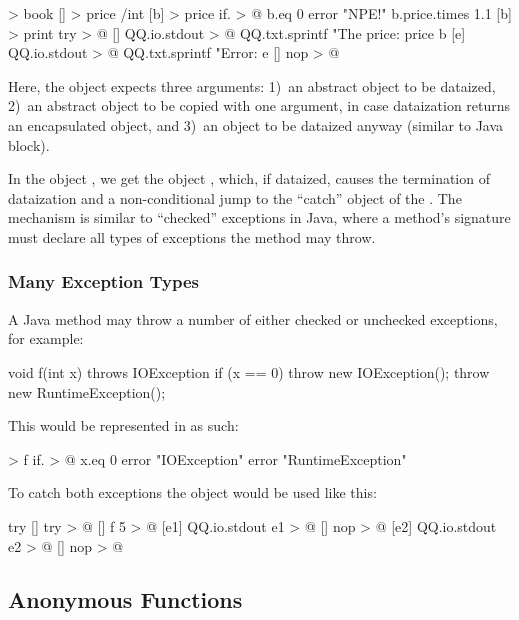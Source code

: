 \documentclass[sigplan,nonacm]{acmart}
\begin{document}
\begin{ffcode}
[] > book
  [] > price /int
[b] > price
  if. > @
    b.eq 0
    error "NPE!"
    b.price.times 1.1
[b] > print
  try > @
    []
      QQ.io.stdout > @
        QQ.txt.sprintf
        "The price: %
        price b
    [e]
      QQ.io.stdout > @
        QQ.txt.sprintf
        "Error: %
        e
    []
      nop > @
\end{ffcode}

Here, the object  expects three arguments: 1)~an abstract object to be dataized, 2)~an abstract object to be copied with one argument, in case dataization returns an encapsulated object, and 3)~an object to be dataized anyway (similar to Java  block).

In the object , we get the object , which, if dataized, causes the termination of dataization and a non-conditional jump to the ``catch'' object of the . The mechanism is similar to ``checked'' exceptions in Java, where a method's signature must declare all types of exceptions the method may throw.

\subsubsection{Many Exception Types}

A Java method may throw a number of either checked or unchecked exceptions, for example:

\begin{ffcode}
void f(int x) throws IOException {
  if (x == 0) {
    throw new IOException();
  }
  throw new RuntimeException();
}
\end{ffcode}

This would be represented in \eolang{} as such:

\begin{ffcode}
[x] > f
  if. > @
    x.eq 0
    error "IOException"
    error "RuntimeException"
\end{ffcode}

To catch both exceptions the object  would be used like this:

\begin{ffcode}
try
  []
    try > @
      []
        f 5 > @
      [e1]
        QQ.io.stdout e1 > @
      []
        nop > @
  [e2]
    QQ.io.stdout e2 > @
  []
    nop > @
\end{ffcode}

\subsection{Anonymous Functions}
\label{sec:blocks}
\end{document}
